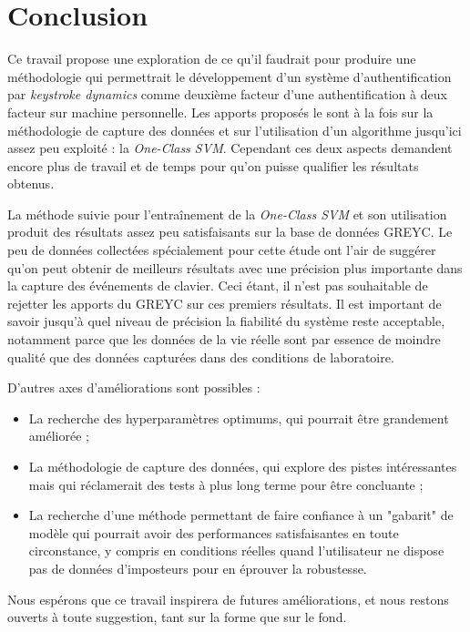 \section{Conclusion}

Ce travail propose une exploration de ce qu'il faudrait pour produire une méthodologie qui permettrait le développement d'un système d'authentification par \textit{keystroke dynamics} comme deuxième facteur d'une authentification à deux facteur sur machine personnelle. Les apports proposés le sont à la fois sur la méthodologie de capture des données et sur l'utilisation d'un algorithme jusqu'ici assez peu exploité : la \textit{One-Class SVM}. Cependant ces deux aspects demandent encore plus de travail et de temps pour qu'on puisse qualifier les résultats obtenus.

La méthode suivie pour l'entraînement de la \textit{One-Class SVM} et son utilisation produit des résultats assez peu satisfaisants sur la base de données GREYC. Le peu de données collectées spécialement pour cette étude ont l'air de suggérer qu'on peut obtenir de meilleurs résultats avec une précision plus importante dans la capture des événements de clavier. Ceci étant, il n'est pas souhaitable de rejetter les apports du GREYC sur ces premiers résultats. Il est important de savoir jusqu'à quel niveau de précision la fiabilité du système reste acceptable, notamment parce que les données de la vie réelle sont par essence de moindre qualité que des données capturées dans des conditions de laboratoire.

D'autres axes d'améliorations sont possibles :

\begin{itemize}
    \item La recherche des hyperparamètres optimums, qui pourrait être grandement améliorée ;
    \item La méthodologie de capture des données, qui explore des pistes intéressantes mais qui réclamerait des tests à plus long terme pour être concluante ;
    \item La recherche d'une méthode permettant de faire confiance à un "gabarit" de modèle qui pourrait avoir des performances satisfaisantes en toute circonstance, y compris en conditions réelles quand l'utilisateur ne dispose pas de données d'imposteurs pour en éprouver la robustesse.
\end{itemize}

Nous espérons que ce travail inspirera de futures améliorations, et nous restons ouverts à toute suggestion, tant sur la forme que sur le fond.